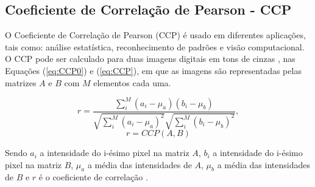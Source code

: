 \begin{comment}

\subsection{THE PEARSON CORRELATION COEFFICIENT}

$CCP$ is used in statistical analyses, pattern recognition and computer vision. 
It can be used to comparing two images in an object recognition system. 
The following equation describes the $CCP$ method for two gray scale digital images\cite{Eugene},
represented by the matrices $A$ and $B$ with $M$ elements each one,
\begin{equation}
r = \frac{\sum \limits_{i}^{M} (a_i-\mu_a)(b_i-\mu_b)}{\sqrt{\sum \limits_{i}^{M} (a_i-\mu_a)^2} \sqrt{\sum\limits_{i}^{M} (b_i-\mu_b)^2}},
\end{equation}
\begin{equation}\label{eq:CCP}
 r=CCP(A,B)
\end{equation}

where $a_i$ is the intensity of the i-th pixel in the  matrix $A$, 
$b_i$ is the intensity of the i-th pixel in the matrix $B$, 
$\mu_a$ is the mean intensity of $A$,
$\mu_b$ is the mean intensity of $B$ and
$r$ is the correlation coefficient \cite{Miranda Neto}.

\end{comment}



\subsection{Coeficiente de Correlação de Pearson - CCP}

O Coeficiente de Correlação de Pearson (CCP) é usado em diferentes aplicações,  
tais como: análise estatística, reconhecimento de padrões e visão computacional. 
O CCP pode ser calculado para duas imagens digitais 
em tons de cinzas \cite{Eugene}, nas Equações (\ref{eq:CCP0}) e (\ref{eq:CCP}), 
em que as imagens são representadas pelas matrizes $A$ e $B$ com $M$ elementos cada uma.

\begin{equation}\label{eq:CCP0}
r = \frac{\sum \limits_{i}^{M} (a_i-\mu_a)(b_i-\mu_b)}{\sqrt{\sum \limits_{i}^{M} (a_i-\mu_a)^2} \sqrt{\sum\limits_{i}^{M} (b_i-\mu_b)^2}},
\end{equation}
\begin{equation}\label{eq:CCP}
 r=CCP(A,B)
\end{equation}

Sendo $a_i$ a intensidade do i-ésimo pixel na matriz $A$, $b_i$ a intensidade do i-ésimo pixel na matriz
$B$, $\mu_a$ a média das intensidades de $A$, $\mu_b$ a média das intensidades de $B$ e $r$ é o coeficiente
de correlação \cite{Miranda Neto}.
